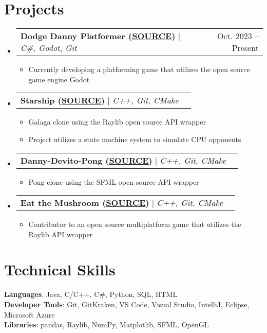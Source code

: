 \documentclass[letterpaper,11pt]{article}
\makeatletter
\newcommand{\resumeItem}[1]{
  \item\small{
    {#1 \vspace{-2pt}}
  }
}
\newcommand{\resumeProjectHeading}[2]{
    \item
    \begin{tabular*}{0.97\textwidth}{l@{\extracolsep{\fill}}r}
      \small#1 & #2 \\
    \end{tabular*}\vspace{-7pt}
}
\newcommand{\resumeSubHeadingListStart}{\begin{itemize}[leftmargin=0.15in, label={}]}
\newcommand{\resumeSubHeadingListEnd}{\end{itemize}}
\newcommand{\resumeItemListStart}{\begin{itemize}}
\newcommand{\resumeItemListEnd}{\end{itemize}\vspace{-5pt}}
\makeatother
\begin{document}
\section{Projects}
    \resumeSubHeadingListStart
      \resumeProjectHeading
          {\textbf{Dodge Danny Platformer (\href{https://github.com/colbySullivan/Dodge-Danny-Platformer}{\underline{SOURCE}})} $|$ \emph{C\#, Godot, Git}}{Oct. 2023 -- Present}
          \resumeItemListStart
            \resumeItem{Currently developing a platforming game that utilizes the open source game engine Godot}
          \resumeItemListEnd
        \resumeProjectHeading
          {\textbf{Starship  (\href{https://github.com/colbySullivan/Starship}{\underline{SOURCE}})} $|$ \emph{C++, Git, CMake}}{}
          \resumeItemListStart
            \resumeItem{Galaga clone using the Raylib open source API wrapper}
            \resumeItem{Project utilizes a state machine system to simulate CPU opponents}
          \resumeItemListEnd
        \resumeProjectHeading
          {\textbf{Danny-Devito-Pong  (\href{https://github.com/colbySullivan/Danny-Devito-Pong}{\underline{SOURCE}})} $|$ \emph{C++, Git, CMake}}{}
          \resumeItemListStart
            \resumeItem{Pong clone using the SFML open source API wrapper}
          \resumeItemListEnd
        \resumeProjectHeading
          {\textbf{Eat the Mushroom  (\href{https://github.com/kaissouDev/Eat-the-Mushroom}{\underline{SOURCE}})} $|$ \emph{C++, Git, CMake}}{}
          \resumeItemListStart
            \resumeItem{Contributor to an open source multiplatform game that utilizes the Raylib API wrapper}
          \resumeItemListEnd
    \resumeSubHeadingListEnd



%
\section{Technical Skills}
 \begin{itemize}[leftmargin=0.15in, label={}]
    \small{\item{
     \textbf{Languages}{: Java, C/C++, C\#, Python, SQL, HTML} \\
     \textbf{Developer Tools}{: Git, GitKraken, VS Code, Visual Studio, IntelliJ, Eclipse, Microsoft Azure} \\
     \textbf{Libraries}{: pandas, Raylib, NumPy, Matplotlib, SFML, OpenGL}
    }}
 \end{itemize}


\end{document}
